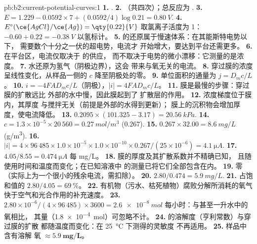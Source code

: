 \begin{solution}{pb:b2:current-potential-curves:1}
\textbf{1.} .
\textbf{2.} （共四次）；总反应为 .
\textbf{3.} $E = 1.229 - 0.0592 \times 7 + (0.0592/4)\log 0.21 = \qty{0.80}{V}$.
\textbf{4.} $E^\circ(\ce{AgCl}/\ce{Ag}) = \qty{0.22}{V}$ 取氯离子活度为 1：
$-0.60 + 0.22 = \qty{-0.38}{V}$ 以氢标计。
\textbf{5.}  的还原属于慢速体系：在其能斯特电势以下，
需要数个十分之一伏的超电势，电流才
开始增大，要达到平台还需更多。
\textbf{6.} 在平台区，电流仅取决于  的供应，
而不取决于电势的微小漂移：它测量的是浓度。
\textbf{7.} 水还原为氢气（阴极边界），这会
带来与氧无关的电流。
\textbf{8.} 穿过膜的浓度呈线性变化，从样品一侧的 $c$
降至阴极处的零。
\textbf{9.} 单位面积的通量为 $j = D_m c/L$。
\textbf{10.} $i = -4FAD_m c/L$（阴极），$|i| = 4FAD_mc/L$。
\textbf{11.} 膜是最慢的步骤：穿过膜的扩散远比
外部的水中慢，因此膜起到了
扩散层的作用。
\textbf{12.} 浓度梯度位于膜内，其厚度
与搅拌无关（前提是外部的水得到更新）；
膜上的沉积物会增加厚度，使电流降低。
\textbf{13.} $0.2095 \times (101.325 - 3.17) = \qty{20.56}{kPa}$.
\textbf{14.} $c = 1.3 \times 10^{-5} \times 20\,560 = \qty{0.27}{mol/m^3}$ ($0.267$).
\textbf{15.} $0.267 \times 32.00 = \qty{8.6}{mg/L}$ (\unit{g/m^3}).
\textbf{16.} $|i| = 4 \times 96\,485 \times 1.0 \times 10^{-5} \times 1.0 \times 10^{-10}
\times 0.267/(25 \times 10^{-6}) = \qty{4.1}{\micro A}$.
\textbf{17.} $4.05/8.55 = \qty{0.474}{\micro A}$ 每 \unit{mg/L}。
\textbf{18.} 膜的厚度及其扩散系数并不精确已知，
且随使用时间和温度而变化；在已知溶液中
的测量已将它们全部包含在内。
\textbf{19.} 零（实际上为一个很小的残余电流，需扣除）。
\textbf{20.} $2.80/0.474 = \qty{5.9}{mg/L}$.
\textbf{21.} 占饱和值的 $2.80/4.05 = 69~\%$。
\textbf{22.} 有机物（污水、枯死植物）腐败分解所消耗的氧气
快于空气和光合作用的补充速度。
\textbf{23.} $2.80 \times 10^{-6}/(4 \times 96\,485) \times 3600 = \qty{2.6e-8}{mol}$
每小时：与甚至一升水中的氧相比，
其量（\qty{1.8e-4}{mol}）可忽略不计。
\textbf{24.}  的溶解度（亨利常数）与穿过膜的扩散
都随温度而变化：在 \qty{25}{\degreeCelsius} 下测得的灵敏度
不再适用。
\textbf{25.} 样品中含有溶解
氧 $\boldsymbol{\approx \qty{5.9}{mg/L}}$。
\end{solution}
